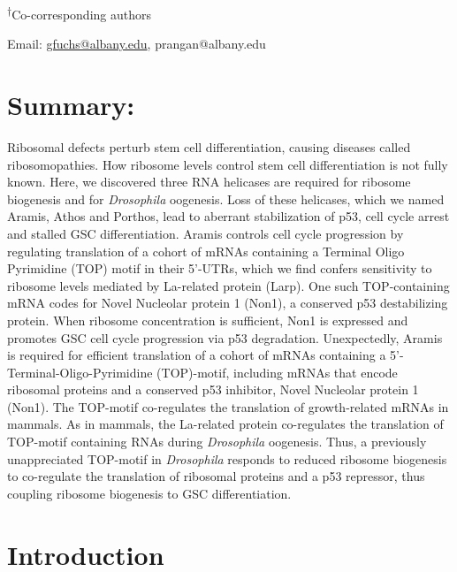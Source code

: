 \documentclass[12pt,oneside]{reedthesis}
\begin{document}
\textsuperscript{†}Co-corresponding authors

Email: \href{mailto:gfuchs@albany.edu}{{gfuchs@albany.edu}},
{prangan@albany.edu}

\hypertarget{summary-1}{%
\section{Summary:}\label{summary-1}}

Ribosomal defects perturb stem cell differentiation, causing diseases called ribosomopathies. How ribosome levels control stem cell differentiation is not fully known. Here, we discovered three RNA helicases are required for ribosome biogenesis and for \emph{Drosophila} oogenesis. Loss of these helicases, which we named Aramis, Athos and Porthos, lead to aberrant stabilization of p53, cell cycle arrest and stalled GSC differentiation. Aramis controls cell cycle progression by regulating translation of a cohort of mRNAs containing a Terminal Oligo Pyrimidine (TOP) motif in their 5'-UTRs, which we find confers sensitivity to ribosome levels mediated by La-related protein (Larp). One such TOP-containing mRNA codes for Novel Nucleolar protein 1 (Non1), a conserved p53 destabilizing protein. When ribosome concentration is sufficient, Non1 is expressed and promotes GSC cell cycle progression via p53 degradation. Unexpectedly, Aramis is required for efficient translation of a cohort of mRNAs containing a 5'-Terminal-Oligo-Pyrimidine (TOP)-motif, including mRNAs that encode ribosomal proteins and a conserved p53 inhibitor, Novel Nucleolar protein 1 (Non1). The TOP-motif co-regulates the translation of growth-related mRNAs in mammals. As in mammals, the La-related protein co-regulates the translation of TOP-motif containing RNAs during \emph{Drosophila} oogenesis. Thus, a previously unappreciated TOP-motif in \emph{Drosophila} responds to reduced ribosome biogenesis to co-regulate the translation of ribosomal proteins and a p53 repressor, thus coupling ribosome biogenesis to GSC differentiation.

\hypertarget{introduction-2}{%
\section{Introduction}\label{introduction-2}}
\end{document}
